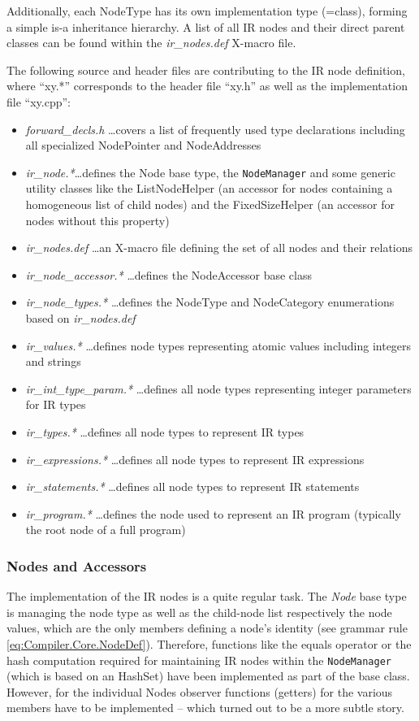 Additionally, each NodeType has its own implementation type (=class), forming a
simple is-a inheritance hierarchy. A list of all IR nodes and their direct
parent classes can be found within the \textit{ir\_nodes.def} X-macro file.

The following source and header files are contributing to the IR node
definition, where ``xy.*'' corresponds to the header file ``xy.h'' as well as the
implementation file ``xy.cpp'':

\begin{itemize}
  \item \textit{forward\_decls.h} \ldots covers a list of frequently used type
  declarations including all specialized NodePointer and NodeAddresses
  \item \textit{ir\_node.*}\ldots defines the Node base type, the \texttt{NodeManager}
  and some generic utility classes like the ListNodeHelper (an accessor for
  nodes containing a homogeneous list of child nodes) and the FixedSizeHelper
  (an accessor for nodes without this property)
  \item \textit{ir\_nodes.def} \ldots an X-macro file defining the set of all
  nodes and their relations
  \item \textit{ir\_node\_accessor.*} \dots defines the NodeAccessor base class
  \item \textit{ir\_node\_types.*} \ldots defines the NodeType and NodeCategory
  enumerations based on \textit{ir\_nodes.def}
  \item \textit{ir\_values.*} \dots defines node types representing atomic
  values including integers and strings
  \item \textit{ir\_int\_type\_param.*} \ldots defines all node types
  representing integer parameters for IR types
  \item \textit{ir\_types.*} \ldots defines all node types to represent IR types
  \item \textit{ir\_expressions.*} \ldots defines all node types to represent IR
  expressions
  \item \textit{ir\_statements.*} \ldots defines all node types to represent IR
  statements
  \item \textit{ir\_program.*} \ldots defines the node used to represent an IR
  program (typically the root node of a full program)
\end{itemize}


\subsubsection{Nodes and Accessors} 
The implementation of the IR nodes is a quite regular task. The \textit{Node}
base type is managing the node type as well as the child-node list respectively
the node values, which are the only members defining a node's identity (see
grammar rule \ref{eq:Compiler.Core.NodeDef}). Therefore, functions like the
equals operator or the hash computation required for maintaining IR nodes
within the \texttt{NodeManager} (which is based on an HashSet) have been implemented
as part of the base class. However, for the individual Nodes observer functions
(getters) for the various members have to be implemented -- which turned out to
be a more subtle story.

